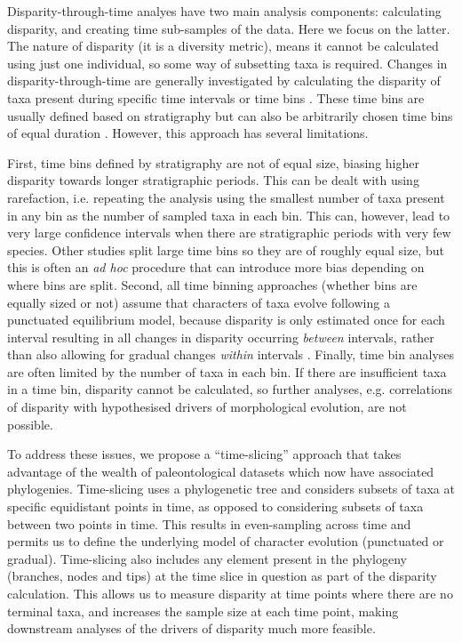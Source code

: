 \documentclass[12pt,a4paper]{article}
\begin{document}
Disparity-through-time analyes have two main analysis components: calculating disparity, and creating time sub-samples of the data. 
Here we focus on the latter.
The nature of disparity (it is a diversity metric), means it cannot be calculated using just one individual, so some way of subsetting taxa is required.
Changes in disparity-through-time are generally investigated by calculating the disparity of taxa present during specific time intervals or time bins \citep[e.g][]{cisneros2010,prentice2011,Hughes20082013,hopkinsdecoupling2013,bentonmodels2014,bensonfaunal2014}.
These time bins are usually defined based on stratigraphy \citep[e.g.][]{cisneros2010,prentice2011,Hughes20082013,bentonmodels2014} but can also be arbitrarily chosen time bins of equal duration \citep{Butler2012,hopkinsdecoupling2013,bensonfaunal2014}.
However, this approach has several limitations.

First, time bins defined by stratigraphy are not of equal size, biasing higher disparity towards longer stratigraphic periods. 
This can be dealt with using rarefaction, i.e. repeating the analysis using the smallest number of taxa present in any bin as the number of sampled taxa in each bin. 
This can, however, lead to very large confidence intervals when there are stratigraphic periods with very few species.
Other studies split large time bins so they are of roughly equal size, but this is often an \textit{ad hoc} procedure that can introduce more bias depending on where bins are split.
Second, all time binning approaches (whether bins are equally sized or not) assume that characters of taxa evolve following a punctuated equilibrium model, because disparity is only estimated once for each interval resulting in all changes in disparity occurring \textit{between} intervals, rather than also allowing for gradual changes \textit{within} intervals \citep{Hunt21042015}.
Finally, time bin analyses are often limited by the number of taxa in each bin.
If there are insufficient taxa in a time bin, disparity cannot be calculated, so further analyses, e.g. correlations of disparity with hypothesised drivers of morphological evolution, are not possible.

To address these issues, we propose a ``time-slicing'' approach that takes advantage of the wealth of paleontological datasets which now have associated phylogenies. 
Time-slicing uses a phylogenetic tree and considers subsets of taxa at specific equidistant points in time, as opposed to considering subsets of taxa between two points in time.
This results in even-sampling across time and permits us to define the underlying model of character evolution (punctuated or gradual).  
Time-slicing also includes any element present in the phylogeny (branches, nodes and tips) at the time slice in question as part of the disparity calculation.
This allows us to measure disparity at time points where there are no terminal taxa, and increases the sample size at each time point, making downstream analyses of the drivers of disparity much more feasible.
\end{document}
